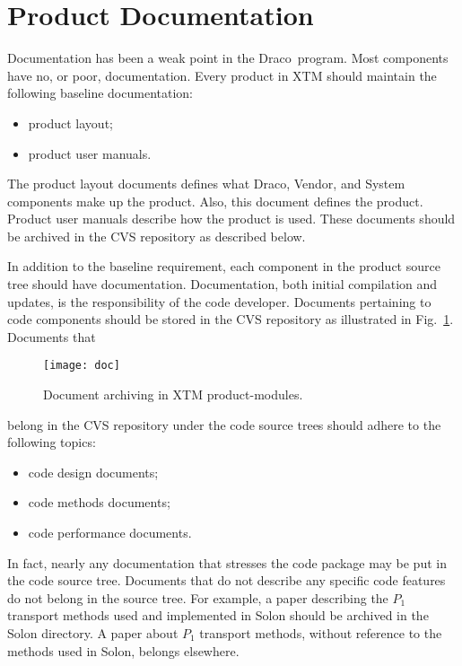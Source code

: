 \documentclass[note]{ResearchNote_pdf}
\newcommand{\draco}{\textsf{Draco}}
\newcommand{\pkg}[1]{\textsf{#1}}
\begin{document}

\section{Product Documentation}
\label{sec:document}

Documentation has been a weak point in the \draco\ program.  Most
components have no, or poor, documentation. Every product in XTM
should maintain the following baseline documentation:
\begin{itemize}
\item product layout;
\item product user manuals.
\end{itemize}
The product layout documents defines what \draco, \pkg{Vendor},
and \pkg{System} components make up the product.  Also, this document
defines the product.  Product user manuals describe how the product
is used.  These documents should be archived in the CVS repository as
described below.

In addition to the baseline requirement, each component in the product
source tree should have documentation.  Documentation, both initial
compilation and updates, is the responsibility of the code developer.
Documents pertaining to code components should be stored in the CVS
repository as illustrated in Fig.~\ref{fig:doc}.  Documents that
\begin{figure}
  \centerline{\texttt{[image: doc]}}
  \caption{Document archiving in XTM product-modules.}
  \label{fig:doc}
\end{figure}
belong in the CVS repository under the code source trees should
adhere to the following topics:
\begin{itemize}
\item code design documents;
\item code methods documents;
\item code performance documents.
\end{itemize}
In fact, nearly any documentation that stresses the code package may
be put in the code source tree.  Documents that do not describe any
specific code features do not belong in the source tree.  For example, 
a paper describing the $P_{1}$ transport methods used and implemented
in \pkg{Solon} should be archived in the \pkg{Solon} directory.  A
paper about $P_{1}$ transport methods, without reference to the
methods used in \pkg{Solon}, belongs elsewhere.
\end{document}
